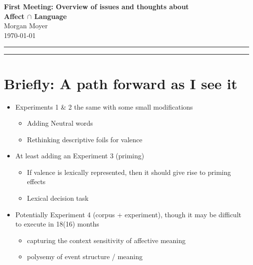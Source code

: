 \documentclass[12pt,letterpaper,table,svgnames,dvipsnames]{article}
\begin{document}
\noindent \Large\textbf{First Meeting: Overview of issues and thoughts about \\Affect $\cap$ Language}\\

\large 
\noindent Morgan Moyer \\ 
\normalsize
\noindent \today \\

\hrule

\bigskip
\bigskip

\tableofcontents

\bigskip 
\bigskip
\hrule 



\section{Briefly: A path forward as I see it}

\begin{itemize}
    \item Experiments 1 \& 2 the same with some small modifications
        \begin{itemize}
            \item Adding Neutral words

            \item Rethinking descriptive foils for valence

        \end{itemize}
    
    \item At least adding an Experiment 3 (priming)

        \begin{itemize}
            \item If valence is lexically represented, then it should give rise to priming effects
            
            \item Lexical decision task

        \end{itemize}

    \item Potentially Experiment 4 (corpus + experiment), though it may be difficult to execute in 18(16) months

        \begin{itemize}
            \item capturing the context sensitivity of affective meaning
            \item polysemy of event structure / meaning
        \end{itemize}
\end{itemize}
\end{document}
